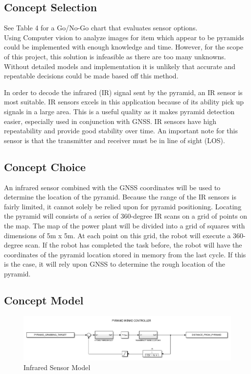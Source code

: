 \documentclass[12pt]{article}
\begin{document}
\subsection{Concept Selection}
See Table 4 for a Go/No-Go chart that evaluates sensor options.\\ 

Using Computer vision to analyze images for item which appear to be pyramids could be implemented with enough knowledge and time. However, for the scope of this project, this solution is infeasible as there are too many unknowns. Without detailed models and implementation it is unlikely that accurate and repeatable decisions could be made based off this method.

In order to decode the infrared (IR) signal sent by the pyramid, an IR sensor is most suitable.  IR sensors excels in this application because of its ability pick up signals in a large area. This is a useful quality as it makes pyramid detection easier, especially used in conjunction with GNSS. IR sensors have high repeatability and provide good stability over time. An important note for this sensor is that the transmitter and receiver must be in line of sight (LOS). 


\subsection{Concept Choice}
An infrared sensor combined with the GNSS coordinates will be used to determine the location of the pyramid. Because the range of the IR sensors is fairly limited, it cannot solely be relied upon for pyramid positioning. Locating the pyramid will consists of a series of 360-degree IR scans on a grid of points on the map. The map of the power plant will be divided into a grid of squares with dimensions of 5m x 5m. At each point on this grid, the robot will execute a 360-degree scan. If the robot has completed the task before, the robot will have the coordinates of the pyramid location stored in memory from the last cycle. If this is the case, it will rely upon GNSS to determine the rough location of the pyramid. 


\subsection{Concept Model}
\begin{figure}[htb!]
\begin{center}
\caption{Infrared Sensor Model}
\includegraphics[scale=0.6]{Figures/simulink_pyramid}
\end{center}
\end{figure}
\FloatBarrier
\end{document}
